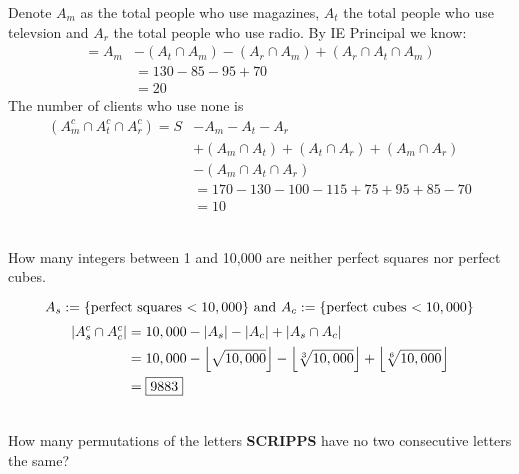 \documentclass[12pt,letterpaper,boxed]{hmcpset}
\DeclarePairedDelimiter\floor{\lfloor}{\rfloor}
\begin{document}
\begin{solution}%
Denote $A_m$ as the total people who use magazines, $A_t$ the total people who use televsion and $A_r$ the total people who use radio. By IE Principal we know:
\begin{align*}  =  A_m & -(A_t \cap A_m)  - (A_r \cap A_m) + (A_r \cap A_t \cap A_m)\\
&=  130 - 85 -95 +70 \\
&= \boxed{20}
\end{align*}
The number of clients who use none is
\begin{align*} (A_m^c \cap A_t^c \cap A_r^c) =  S &- A_m -A_t  - A_r \\&+ (A_m \cap A_t)+(A_t \cap A_r) +(A_m \cap A_r) \\&- (A_m \cap A_t \cap A_r) \\
&=  170 - 130 -100 -115 + 75+95 +85 - 70 \\
&= \boxed{10}
\end{align*}
\end{solution}

\begin{problem}[Shahriari 8.1.4][20]\\
How many integers between 1 and 10,000 are neither perfect squares nor perfect cubes.
\end{problem}

\begin{solution}%
\[
A_s:= \{ \text{perfect squares $< 10,000$} \} \text{ and }\\
A_c:= \{ \text{perfect cubes $< 10,000$} \}
\]
\begin{align*}
| A_s^c \cap A_c^c | &= 10,000-|A_s| - |A_c| + |A_s \cap A_c|\\
&=10,000 - \floor*{\sqrt{10,000}} - \floor*{\sqrt[3]{10,000}} + \floor*{\sqrt[6]{10,000}}\\
&=\boxed{9883}
\end{align*}
\end{solution}

\begin{problem}[Shahriari 8.1.6][20]\\
How many permutations of the letters \textbf{SCRIPPS} have no two consecutive letters the same?
\end{problem}
\end{document}
